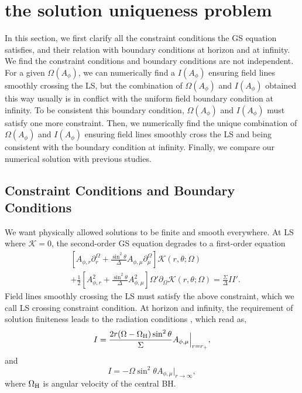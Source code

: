 \documentclass[iop,apj]{emulateapj}
\def\sst{\sin^2\theta}
\def\Ar{A_{\phi,r}}
\def\Am{A_{\phi,\mu}}
\def\be{\begin{equation}}
\def\ee{\end{equation}}
\def\WH{\Omega_{\rm H}}
\begin{document}
\section{the solution uniqueness problem}
\label{sec:sketch}


In this section, we first clarify all the constraint conditions the GS equation satisfies,
and their relation with boundary conditions at horizon and at infinity.
We find the constraint conditions and boundary conditions are not independent.
For a given $\Omega(A_\phi)$, we can numerically
find a $I(A_\phi)$ ensuring field lines smoothly crossing the LS, but the combination of
$\Omega(A_\phi)$ and $I(A_\phi)$ obtained this way usually is in conflict with the uniform field boundary
condition at infinity. To be consistent this boundary condition, $\Omega(A_\phi)$ and $I(A_\phi)$ must
satisfy one more constraint. Then, we numerically find the unique combination of $\Omega(A_\phi)$ and $I(A_\phi)$
ensuring field lines smoothly cross the LS and being consistent with the boundary condition at infinity.
Finally, we compare our numerical solution with previous studies.

\subsection{Constraint Conditions and Boundary Conditions}
We want physically allowed solutions to be finite and smooth everywhere.
At LS where $\mathcal K = 0$, the second-order GS equation degrades to a first-order equation
\be
\label{eq:ls}
\begin{aligned}
& \left[\Ar \partial_r^\Omega  +  \frac{\sst}{\Delta}\Am \partial_\mu^\Omega\right] \mathcal K(r,\theta; \Omega ) \\
&+  \frac{1}{2}\left[\Ar^2 + \frac{\sst}{\Delta}\Am^2\right]  \Omega' \partial_\Omega \mathcal K(r,\theta; \Omega)
= \frac{\Sigma}{\Delta}II'.
\end{aligned}
\ee
Field lines smoothly crossing the LS must satisfy the above constraint,
which we call LS crossing constraint condition. At horizon and infinity,
the requirement of solution finiteness leads to the radiation conditions \citep[e.g.][]{Pan2016},
which read as,
\be
\label{eq:znajek}
    I = \frac{2r(\Omega-\WH)\sst}{\Sigma} \Am \Big|_{r=r_+},
\ee
and
\be
\label{eq:infty}
    I = -\Omega\sst \Am \Big|_{r\rightarrow \infty},
\ee
where $\WH$ is angular velocity of the central BH.
\end{document}

